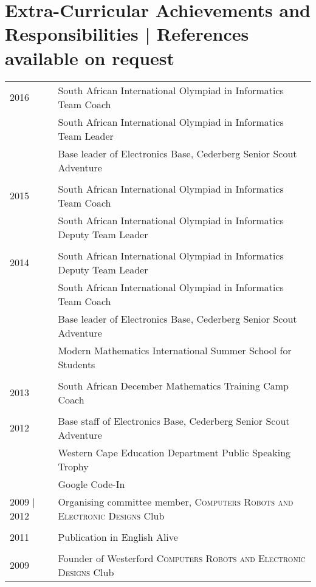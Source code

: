 \section{Extra-Curricular Achievements and Responsibilities \footnotesize | References available on request}

\begin{tabular}{R{2.5cm}|l}
2016 & South African International Olympiad in Informatics Team Coach\\
& South African International Olympiad in Informatics Team Leader\\
& Base leader of Electronics Base, Cederberg Senior Scout Adventure\\
&\\
2015 & South African International Olympiad in Informatics Team Coach\\
& South African International Olympiad in Informatics Deputy Team Leader\\
&\\
2014& South African International Olympiad in Informatics Deputy Team Leader\\
& South African International Olympiad in Informatics Team Coach\\
& Base leader of Electronics Base, Cederberg Senior Scout Adventure\\
& Modern Mathematics International Summer School for Students\\
&\\
2013 & South African December Mathematics Training Camp Coach\\
&\\
2012 & Base staff of Electronics Base, Cederberg Senior Scout Adventure\\
& Western Cape Education Department Public Speaking Trophy\\
&Google Code-In\\
2009 | 2012 & Organising committee member, \textsc{Computers Robots and Electronic Designs} Club\\
&\\
2011 & Publication in English Alive\\
&\\
2009 & Founder of Westerford \textsc{Computers Robots and Electronic Designs} Club\\
\end{tabular}

